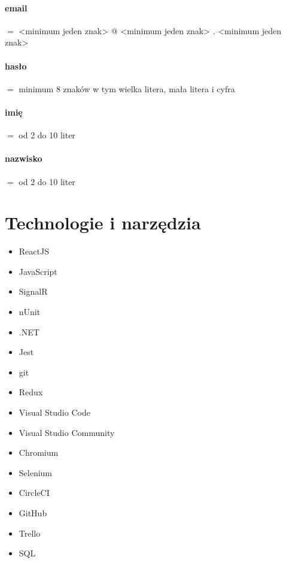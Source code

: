 \documentclass[10pt]{report}
\begin{document}
		\paragraph{email} $=$ <minimum jeden znak> @ <minimum jeden znak> .  <minimum jeden znak>
		\paragraph{hasło} $=$ minimum 8 znaków w tym wielka litera, mała litera i cyfra 
		\paragraph{imię}  $=$ od 2 do 10 liter
		\paragraph{nazwisko} $=$ od 2 do 10 liter

	
\section{Technologie i narzędzia}

\begin{itemize}
	\item ReactJS
	\item JavaScript
	\item SignalR 
	\item nUnit  
	\item .NET 
	\item Jest
	\item git
	\item Redux
	\item Visual Studio Code  
	\item Visual Studio Community 
	\item Chromium
	\item Selenium
	\item CircleCI
	\item GitHub 
	\item  Trello
	\item SQL
\end{itemize}

	
	
\end{document}
